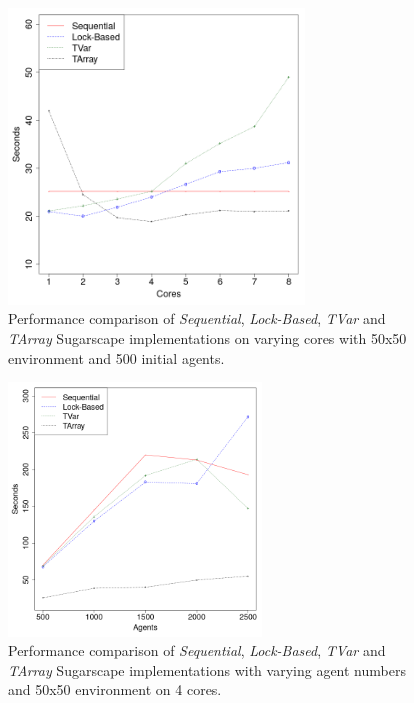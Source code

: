 \documentclass{bmcart}
\begin{document}
\begin{backmatter}
\begin{figure}[h!]
	\includegraphics[width=0.7\textwidth, angle=0]{./sugarscape_varyingcores_constagents.png}
	\caption{Performance comparison of \textit{Sequential}, \textit{Lock-Based}, \textit{TVar} and \textit{TArray} Sugarscape implementations on varying cores with 50x50 environment and 500 initial agents.}
	\label{fig:sugarscape_varyingcores_constagents}
\end{figure}

\begin{figure}[h!]
	\includegraphics[width=0.6\textwidth, angle=0]{./sugarscape_varyingagents_constcores.png}
	\caption{Performance comparison of \textit{Sequential}, \textit{Lock-Based}, \textit{TVar} and \textit{TArray} Sugarscape implementations with varying agent numbers and 50x50 environment on 4 cores.}
	\label{fig:sugarscape_varyingagents_constcores}
\end{figure}



\end{backmatter}
\end{document}
